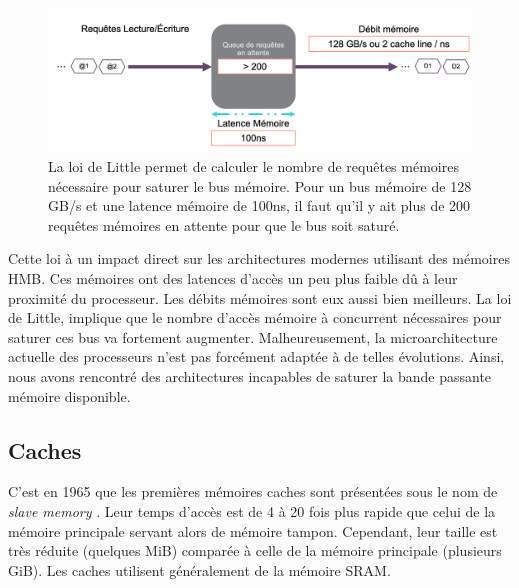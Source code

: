 \begin{figure}
    \center
    \includegraphics[width=12cm]{images/cpu_littlelaw.png}
    \caption{ La loi de Little permet de calculer le nombre de requêtes mémoires nécessaire pour saturer le bus mémoire. Pour un bus mémoire de 128 GB/s et une latence mémoire de 100ns, il faut qu'il y ait plus de 200 requêtes mémoires en attente pour que le bus soit saturé.
    \label{pic_cpu_littlelaw}}
\end{figure}

Cette loi à un impact direct sur les architectures modernes utilisant des mémoires HMB. Ces mémoires ont des latences d’accès un peu plus faible dû à leur proximité du processeur. Les débits mémoires sont eux aussi bien meilleurs. La loi de Little, implique que le nombre d’accès mémoire à concurrent nécessaires pour saturer ces bus va fortement augmenter. Malheureusement, la microarchitecture actuelle des processeurs n’est pas forcément adaptée à de telles évolutions. Ainsi, nous avons rencontré des architectures incapables de saturer la bande passante mémoire disponible. 



\subsection{Caches} \label{sec:cache}
C'est en 1965 que les premières mémoires caches sont présentées sous le nom de \textit{slave memory} \cite{wilkes1965slave}. Leur temps d'accès est de 4 à 20 fois plus rapide que celui de la mémoire principale servant alors de mémoire tampon. Cependant, leur taille est très réduite (quelques MiB) comparée à celle de la mémoire principale (plusieurs GiB). Les caches utilisent généralement de la mémoire SRAM.

